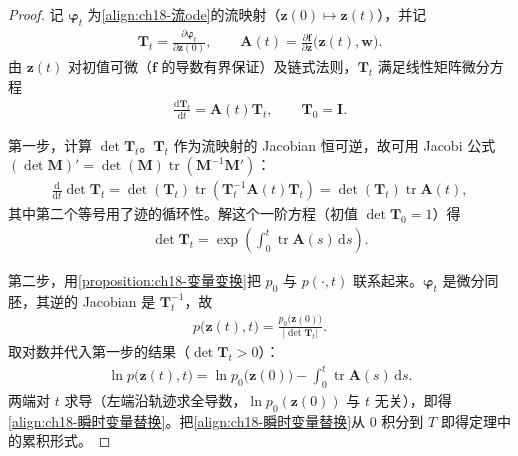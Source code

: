\documentclass[../../main.tex]{subfiles}
\begin{document}
\begin{proof}
记 $\bm{\varphi}_t$ 为\eqref{align:ch18-流ode}的流映射（$\bm{z}(0)\mapsto\bm{z}(t)$），并记
\begin{align*}
  \bm{T}_t=\frac{\partial\bm{\varphi}_t}{\partial\bm{z}(0)},\qquad \bm{A}(t)=\frac{\partial\bm{f}}{\partial\bm{z}}\big(\bm{z}(t),\bm{w}\big).
\end{align*}
由 $\bm{z}(t)$ 对初值可微（$\bm{f}$ 的导数有界保证）及链式法则，$\bm{T}_t$ 满足线性矩阵微分方程
\begin{align*}
  \frac{\mathrm{d}\bm{T}_t}{\mathrm{d}t}=\bm{A}(t)\bm{T}_t,\qquad \bm{T}_0=\bm{I}.
\end{align*}

第一步，计算 $\det\bm{T}_t$。$\bm{T}_t$ 作为流映射的 Jacobian 恒可逆，故可用 Jacobi 公式 $(\det\bm{M})'=\det(\bm{M})\operatorname{tr}(\bm{M}^{-1}\bm{M}')$：
\begin{align*}
  \frac{\mathrm{d}}{\mathrm{d}t}\det\bm{T}_t=\det(\bm{T}_t)\operatorname{tr}\left(\bm{T}_t^{-1}\bm{A}(t)\bm{T}_t\right)=\det(\bm{T}_t)\operatorname{tr}\bm{A}(t),
\end{align*}
其中第二个等号用了迹的循环性。解这个一阶方程（初值 $\det\bm{T}_0=1$）得
\begin{align*}
  \det\bm{T}_t=\exp\left(\int_{0}^{t}\operatorname{tr}\bm{A}(s)\,\mathrm{d}s\right).
\end{align*}

第二步，用\cref{proposition:ch18-变量变换}把 $p_0$ 与 $p(\cdot,t)$ 联系起来。$\bm{\varphi}_t$ 是微分同胚，其逆的 Jacobian 是 $\bm{T}_t^{-1}$，故
\begin{align*}
  p\big(\bm{z}(t),t\big)=\frac{p_0\big(\bm{z}(0)\big)}{\left|\det\bm{T}_t\right|}.
\end{align*}
取对数并代入第一步的结果（$\det\bm{T}_t>0$）：
\begin{align*}
  \ln p\big(\bm{z}(t),t\big)=\ln p_0\big(\bm{z}(0)\big)-\int_{0}^{t}\operatorname{tr}\bm{A}(s)\,\mathrm{d}s .
\end{align*}
两端对 $t$ 求导（左端沿轨迹求全导数，$\ln p_0(\bm{z}(0))$ 与 $t$ 无关），即得\eqref{align:ch18-瞬时变量替换}。把\eqref{align:ch18-瞬时变量替换}从 $0$ 积分到 $T$ 即得定理中的累积形式。
\end{proof}
\end{document}
